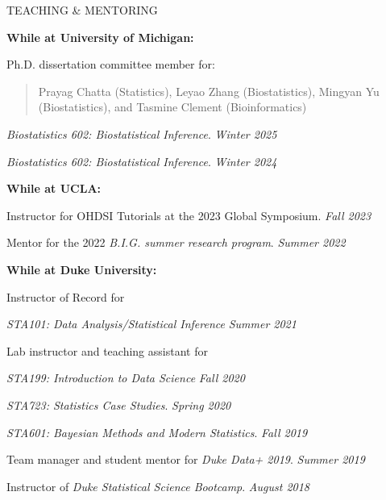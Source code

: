 \documentclass{resume} %
\newcommand{\thisYear}[1]{
	#1
}
\begin{document}
\begin{rSection}{TEACHING \& MENTORING}
	
\hspace*{-0.2in}\textbf{While at University of Michigan:}

Ph.D. dissertation committee member for: 

\begin{quote}
	Prayag Chatta (Statistics), Leyao Zhang (Biostatistics),  Mingyan Yu (Biostatistics), and Tasmine Clement (Bioinformatics)
\end{quote}
	
    \emph{Biostatistics 602: Biostatistical Inference}.  \hfill {\em Winter 2025}

 \emph{Biostatistics 602: Biostatistical Inference}.  \hfill {\em Winter 2024}

\smallskip 

\hspace*{-0.2in}\textbf{While at UCLA:}
	
	Instructor for OHDSI Tutorials at the 2023 Global Symposium.  \hfill {\em Fall 2023}
		
	Mentor for the 2022 \emph{B.I.G. summer research program}.  \hfill {\em Summer 2022}
	
\smallskip 
	
\hspace*{-0.2in}\textbf{While at Duke University:}
	
	Instructor of Record for 
	
	
	\emph{STA101: Data Analysis/Statistical Inference} \hfill {\em Summer 2021}
	
	Lab instructor and teaching assistant for 
	
	\hspace{0.2in} \emph{STA199: Introduction to Data Science} \hfill {\em Fall 2020}
	
	\hspace{0.2in} \emph{STA723: Statistics Case Studies}. \hfill {\em Spring 2020}
	
	\hspace{0.2in} \emph{STA601: Bayesian Methods and Modern Statistics}. \hfill {\em Fall 2019}
	
	
	Team manager and student mentor for \emph{Duke Data+ 2019}. \hfill {\em Summer 2019}
	
	Instructor of \emph{Duke Statistical Science Bootcamp}. \hfill {\em August 2018}
\end{rSection}
\end{document}
